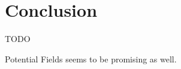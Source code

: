 \section{Conclusion}\label{section:conclusion}

TODO

Potential Fields seems to be promising as well.

